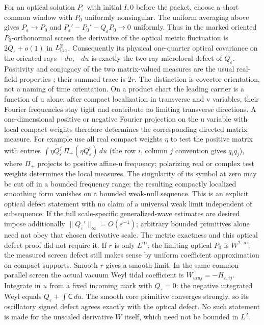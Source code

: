 \documentclass[11pt]{article}
\begin{document}
For an optical solution \(P_\varepsilon\) with initial \(I,0\) before the packet, choose a short common window with \(P_0\) uniformly nonsingular. The uniform averaging above gives
\(P_\varepsilon\to P_0\) and \(P_\varepsilon'-P_0'-Q_\varepsilon P_0\to0\) uniformly. Thus in the marked oriented \(P_0\)-orthonormal screen the derivative of the optical metric fluctuation is \(2Q_\varepsilon+o(1)\) in \(L^2_{\rm loc}\). Consequently its physical one-quarter optical covariance on the oriented rays \(+du,-du\) is exactly the two-ray microlocal defect of \(Q_\varepsilon\). Positivity and conjugacy of the two matrix-valued measures are the usual real-field properties \cite{gerard}; their summed trace is \(2r\). The distinction is covector orientation, not a naming of time orientation. On a product chart the leading carrier is a function of u alone: after compact localization in transverse and v variables, their Fourier frequencies stay tight and contribute no limiting transverse directions. A one-dimensional positive or negative Fourier projection on the u variable with local compact weights therefore determines the corresponding directed matrix measure. For example use all real compact weights \(\eta\) to test the positive matrix with entries
\(\int \overline{\eta Q_\varepsilon^j}\,\Pi_+(\eta Q_\varepsilon^i)\,du\)
(the row \(i\), column \(j\) convention gives \(q_i\overline{q_j}\)),
where \(\Pi_+\) projects to positive affine-u frequency; polarizing real or complex test weights determines the local measures. The singularity of its symbol at zero may be cut off in a bounded frequency range; the resulting compactly localized smoothing form vanishes on a bounded weak-null sequence. This is an explicit optical defect statement with no claim of a universal weak limit independent of subsequence. If the full scale-specific generalized-wave estimates are desired impose additionally \(\|Q_\varepsilon'\|_\infty=O(\varepsilon^{-1})\); arbitrary bounded primitives alone need not obey that chosen derivative scale. The metric exactness and this optical defect proof did not require it. If \(r\) is only \(L^\infty\), the limiting optical \(P_0\) is \(W^{2,\infty}\); the measured screen defect still makes sense by uniform coefficient approximation on compact supports. Smooth \(r\) gives a smooth limit. In the same common parallel screen the actual vacuum Weyl tidal coefficient is \(W_{uiuj}=-H_{\varepsilon,ij}\). Integrate in \(u\) from a fixed incoming mark with \(Q_\varepsilon=0\): the negative integrated Weyl equals \(Q_\varepsilon+\int\mathsf C\,du\). The smooth core primitive converges strongly, so its oscillatory signed defect agrees exactly with the optical defect. No such statement is made for the unscaled derivative \(W\) itself, which need not be bounded in \(L^2\).
\end{document}
